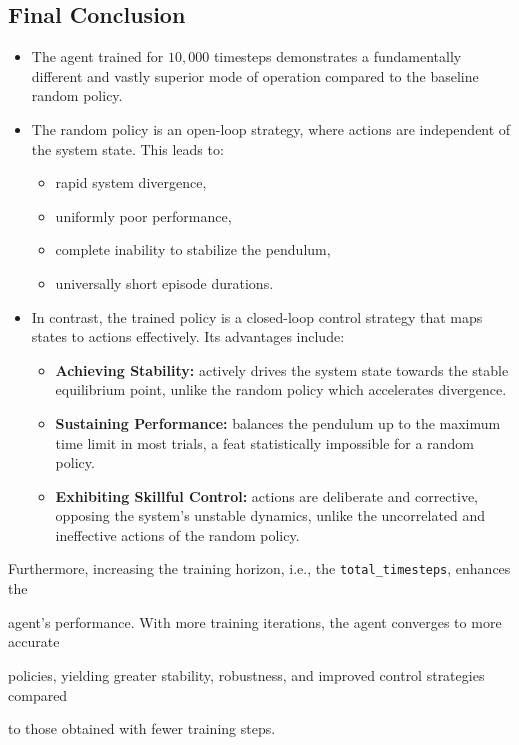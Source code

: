 \documentclass[12pt]{article}
\begin{document}
\subsection{Final Conclusion}

\begin{itemize}
    \item The agent trained for $10{,}000$ timesteps demonstrates a fundamentally different and vastly superior mode of operation compared to the baseline random policy.  

    \item The random policy is an open-loop strategy, where actions are independent of the system state. This leads to:
    \begin{itemize}
        \item rapid system divergence,
        \item uniformly poor performance,
        \item complete inability to stabilize the pendulum,
        \item universally short episode durations.
    \end{itemize}

    \item In contrast, the trained policy is a closed-loop control strategy that maps states to actions effectively. Its advantages include:
    \begin{itemize}
        \item \textbf{Achieving Stability:} actively drives the system state towards the stable equilibrium point, unlike the random policy which accelerates divergence.  
        \item \textbf{Sustaining Performance:} balances the pendulum up to the maximum time limit in most trials, a feat statistically impossible for a random policy.  
        \item \textbf{Exhibiting Skillful Control:} actions are deliberate and corrective, opposing the system’s unstable dynamics, unlike the uncorrelated and ineffective actions of the random policy.  
    \end{itemize}
 
\end{itemize}

Furthermore, increasing the training horizon, i.e., the \texttt{total\_timesteps}, enhances the 

agent's performance. With more training iterations, the agent converges to more accurate 

policies, yielding greater stability, robustness, and improved control strategies compared 

to those obtained with fewer training steps.  
\end{document}
